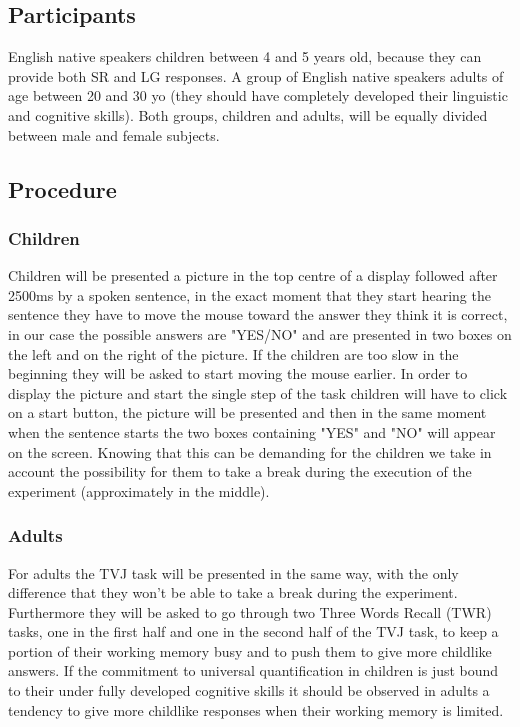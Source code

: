 \documentclass[10pt, a4]{article}
\begin{document}
\subsection{Participants}
English native speakers children between 4 and 5 years old, because they can provide both SR and LG responses.
A group of English native speakers adults of age between 20 and 30 yo (they should have completely developed their linguistic
and cognitive skills). Both groups, children and adults, will be equally divided between male and female subjects.

\subsection{Procedure}
\subsubsection{Children}
Children will be presented a picture in the top centre of a display followed after 2500ms by a spoken sentence,
in the exact moment that they start hearing the sentence they have to move the mouse toward the answer they think it
is correct, in our case the possible answers are "YES/NO" and are presented in two boxes on the left and on the
right of the picture. If the children are too slow in the beginning they will be asked to start moving the mouse earlier.
In order to display the picture and start the single step of the task children will have to click on a start button,
the picture will be presented and then in the same moment when the sentence starts the two boxes containing "YES" and "NO"
will appear on the screen.
Knowing that this can be demanding for the children we take in account the possibility for them to take a break during
the execution of the experiment (approximately in the middle).

\subsubsection{Adults}
For adults the TVJ task will be presented in the same way, with the only difference that they won't be able to take
a break during the experiment. Furthermore they will be asked to go through two Three Words Recall (TWR) tasks, one in the
first half and one in the second half of the TVJ task, to keep a portion of their working memory busy and to push them
to give more childlike answers.
If the commitment to universal quantification in children is just bound to their
under fully developed cognitive skills it should be observed in adults a tendency
to give more childlike responses when their working memory is limited.
\end{document}
